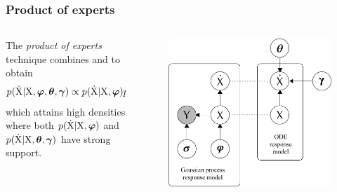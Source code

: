 \begin{frame}[t]
    \frametitle{Product of experts}
    \begin{columns}
        \begin{column}{0.65\textwidth}            
            The \emph{product of experts} technique combines  and  to obtain
            \begin{align}
                p(\mathrm{\dot{X}}\vert\mathrm{X},\boldsymbol{\varphi},\boldsymbol{\theta},\boldsymbol{\gamma})
                \propto p(\mathrm{\dot{X}}\vert\mathrm{X},\boldsymbol{\varphi}) p(\mathrm{\dot{X}}\vert\mathrm{X},\boldsymbol{\theta},\boldsymbol{\gamma}) 
                \label{eq-gmgp-poe}
            \end{align}
            which attains high densities where both $p(\mathrm{\dot{X}}\vert\mathrm{X},\boldsymbol{\varphi})$ and $p(\mathrm{\dot{X}}\vert\mathrm{X},\boldsymbol{\theta},\boldsymbol{\gamma})$ have strong support. 
        \end{column}
        \begin{column}{0.35\textwidth}       
            \begin{figure}
                \centering
                \includegraphics[width=1\textwidth]{graphics/gradient-matching-model}                    
            \end{figure} 
        \end{column}
    \end{columns}
\end{frame}

